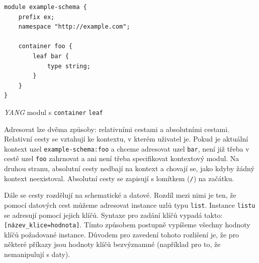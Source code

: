 \documentclass[thesis=B,czech,hidelinks]{FITthesis}[2019/03/06]
\begin{document}
\begin{listing}
\begin{verbatim}
module example-schema {
    prefix ex;
    namespace "http://example.com";

    container foo {
        leaf bar {
            type string;
        }
    }
}
\end{verbatim}
\caption{\textit{YANG} modul s \texttt{container} \texttt{leaf}}\label{yang:adresace}
\end{listing}

Adresovat lze dvěma způsoby: relativními cestami a absolutními cestami. Relativní cesty se vztahují ke kontextu, v kterém uživatel je. Pokud je aktuální kontext uzel \texttt{example-schema:foo} a chceme adresovat uzel \texttt{bar}, není již třeba v cestě uzel \texttt{foo} zahrnovat a ani není třeba specifikovat kontextový modul. Na druhou stranu, absolutní cesty nedbají na kontext a chovají se, jako kdyby žádný kontext neexistoval. Absolutní cesty se zapisují s lomítkem (\texttt{/}) na začátku.

Dále se cesty rozdělují na schematické a datové. Rozdíl mezi nimi je ten, že pomocí datových cest můžeme adresovat instance uzlů typu \texttt{list}. Instance \texttt{listu} se adresují pomocí jejich klíčů. Syntaxe pro zadání klíčů vypadá takto: \verb¨[název_klice=hodnota]¨. Tímto způsobem postupně vypíšeme všechny hodnoty klíčů požadované instance. Důvodem pro zavedení tohoto rozlišení je, že pro některé příkazy jsou hodnoty klíčů bezvýznamné (například pro to, že nemanipulují s daty).
\end{document}
